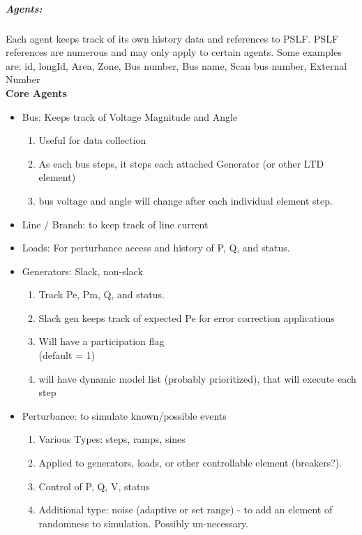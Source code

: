 \documentclass[12pt]{article}
\begin{document}
\pagebreak

\begin{minipage}[t]{.5\textwidth}
\subparagraph{Agents:} Each agent keeps track of its own history data and references to PSLF.  PSLF references are numerous and may only apply to certain agents. Some examples are: id, longId, Area, Zone, Bus number, Bus name, Scan bus number, External Number
\\
\textbf{Core Agents}
\begin{itemize}
	\item Bus: Keeps track of Voltage Magnitude and Angle
	\begin{enumerate}
		\item Useful for data collection 
		\item As each bus steps, it steps each attached Generator (or other LTD element) 
		\item bus voltage and angle will change after each individual element step.
	\end{enumerate}
	\item Line / Branch: to keep track of line current 
	\item Loads: For perturbance access and history of P, Q, and status.
	\item Generators: Slack, non-slack 
	\begin{enumerate}
		\item Track Pe, Pm, Q, and status.
		\item Slack gen keeps track of expected Pe for error correction applications
		\item Will have a participation flag \\(default = 1)
		\item will have dynamic model list (probably prioritized), that will execute each step
	\end{enumerate} 
	\item Perturbance: to simulate known/possible events
	\begin{enumerate}
		\item Various Types: steps, ramps, sines
		\item Applied to generators, loads, or other controllable element (breakers?).
		\item Control of P, Q, V, status
		\item Additional type: noise (adaptive or set range) - to add an element of randomness to simulation. Possibly un-necessary.
	\end{enumerate} 
	
\end{itemize}


\end{minipage}
\end{document}
